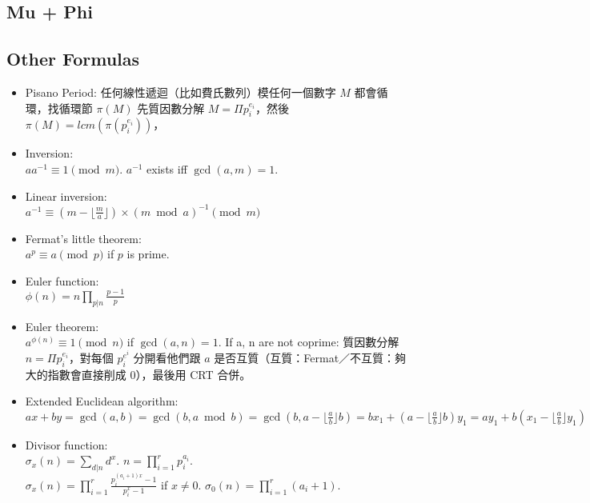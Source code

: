 \documentclass[a4paper,10pt,twocolumn,oneside]{article}
\begin{document}
\subsection{Mu + Phi}



\subsection{Other Formulas}
{\normalsize \begin{itemize}
    \item Pisano Period: 任何線性遞迴（比如費氏數列）模任何一個數字 $M$ 都會循環，找循環節 $\pi(M)$ 先質因數分解 $M = \Pi p_i^{e_i}$，然後 $\pi(M) = lcm(\pi(p_i^{e_i}))$，

    \item Inversion:\\ $aa^{-1} \equiv 1 \pmod{m}$. $a^{-1}$ exists iff $\gcd(a,m)=1$.
    
    \item Linear inversion:\\ $a^{-1} \equiv (m - \lfloor\frac{m}{a}\rfloor) \times (m \bmod a)^{-1} \pmod{m}$
    
    \item Fermat's little theorem:\\ $a^p \equiv a \pmod{p}$ if $p$ is prime.
    
    \item Euler function:\\ $\phi(n)=n \prod_{p|n} \frac{p-1}{p}$
    
    \item Euler theorem:\\ $a^{\phi(n)} \equiv 1 \pmod{n}$ if $\gcd(a,n) = 1$.  If a, n are not coprime: 質因數分解 $n = \Pi p_i^{e_i}$，對每個 $p_i^{e^i}$ 分開看他們跟 $a$ 是否互質（互質：Fermat／不互質：夠大的指數會直接削成 $0$），最後用 CRT 合併。
    
    \item Extended Euclidean algorithm:\\
    $ax+by=\gcd(a,b)=\gcd(b, a \bmod b)=\gcd(b, a-\lfloor\frac{a}{b}\rfloor b)=bx_1+(a-\lfloor\frac{a}{b}\rfloor b)y_1=ay_1+b(x_1-\lfloor\frac{a}{b}\rfloor y_1)$
    
    \item Divisor function:\\ $\sigma_x(n) = \sum_{d|n}d^x$. $n=\prod_{i=1}^r p_i^{a_i}$.\\ $\sigma_x(n)=\prod_{i=1}^r \frac{p_i^{(a_i+1)x}-1}{p_i^x-1}$ if $x \neq 0$. $\sigma_0(n)=\prod_{i=1}^r (a_i+1)$.
    

\end{itemize}}
\end{document}
